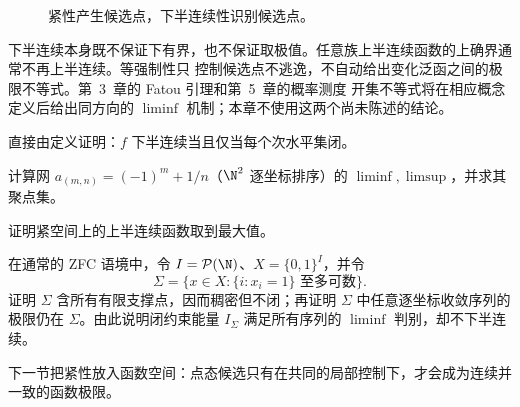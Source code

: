 \begin{figure}[htbp]
\centering
{}
\caption{紧性产生候选点，下半连续性识别候选点。}\label{fig:1-2-3-direct-method}
\end{figure}

下半连续本身既不保证下有界，也不保证取极值。任意族上半连续函数的上确界通常不再上半连续。等强制性只
控制候选点不逃逸，不自动给出变化泛函之间的极限不等式。第~3~章的 Fatou 引理和第~5~章的概率测度
开集不等式将在相应概念定义后给出同方向的 \(\liminf\) 机制；本章不使用这两个尚未陈述的结论。

\begin{exercise}
直接由定义证明：\(f\) 下半连续当且仅当每个次水平集闭。
\end{exercise}
\begin{exercise}
计算网 \(a_{(m,n)}=(-1)^m+1/n\)（\(\N^2\) 逐坐标排序）的 \(\liminf,\limsup\)，并求其聚点集。
\end{exercise}
\begin{exercise}
证明紧空间上的上半连续函数取到最大值。
\end{exercise}
\begin{exercise}
在通常的 ZFC 语境中，令 \(I=\mathcal P(\N)\)、\(X=\{0,1\}^{I}\)，并令
\[
 \Sigma=\{x\in X:\{i:x_i=1\}\text{ 至多可数}\}.
\]
证明 \(\Sigma\) 含所有有限支撑点，因而稠密但不闭；再证明 \(\Sigma\) 中任意逐坐标收敛序列的极限仍在
\(\Sigma\)。由此说明闭约束能量 \(I_\Sigma\) 满足所有序列的 \(\liminf\) 判别，却不下半连续。
\end{exercise}

下一节把紧性放入函数空间：点态候选只有在共同的局部控制下，才会成为连续并一致的函数极限。
